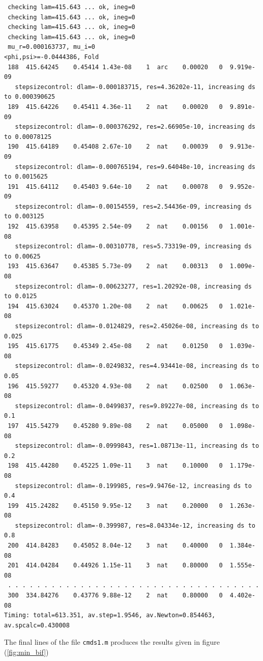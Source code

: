 \documentclass[a4paper,12pt]{article}
\begin{document}
\begin{verbatim}
 checking lam=415.643 ... ok, ineg=0
 checking lam=415.643 ... ok, ineg=0
 checking lam=415.643 ... ok, ineg=0
 checking lam=415.643 ... ok, ineg=0
 mu_r=0.000163737, mu_i=0 
<phi,psi>=-0.0444386, Fold
 188  415.64245    0.45414 1.43e-08    1  arc    0.00020   0  9.919e-09 
   stepsizecontrol: dlam=-0.000183715, res=4.36202e-11, increasing ds to 0.000390625
 189  415.64226    0.45411 4.36e-11    2  nat    0.00020   0  9.891e-09 
   stepsizecontrol: dlam=-0.000376292, res=2.66905e-10, increasing ds to 0.00078125
 190  415.64189    0.45408 2.67e-10    2  nat    0.00039   0  9.913e-09 
   stepsizecontrol: dlam=-0.000765194, res=9.64048e-10, increasing ds to 0.0015625
 191  415.64112    0.45403 9.64e-10    2  nat    0.00078   0  9.952e-09 
   stepsizecontrol: dlam=-0.00154559, res=2.54436e-09, increasing ds to 0.003125
 192  415.63958    0.45395 2.54e-09    2  nat    0.00156   0  1.001e-08 
   stepsizecontrol: dlam=-0.00310778, res=5.73319e-09, increasing ds to 0.00625
 193  415.63647    0.45385 5.73e-09    2  nat    0.00313   0  1.009e-08 
   stepsizecontrol: dlam=-0.00623277, res=1.20292e-08, increasing ds to 0.0125
 194  415.63024    0.45370 1.20e-08    2  nat    0.00625   0  1.021e-08 
   stepsizecontrol: dlam=-0.0124829, res=2.45026e-08, increasing ds to 0.025
 195  415.61775    0.45349 2.45e-08    2  nat    0.01250   0  1.039e-08 
   stepsizecontrol: dlam=-0.0249832, res=4.93441e-08, increasing ds to 0.05
 196  415.59277    0.45320 4.93e-08    2  nat    0.02500   0  1.063e-08 
   stepsizecontrol: dlam=-0.0499837, res=9.89227e-08, increasing ds to 0.1
 197  415.54279    0.45280 9.89e-08    2  nat    0.05000   0  1.098e-08 
   stepsizecontrol: dlam=-0.0999843, res=1.08713e-11, increasing ds to 0.2
 198  415.44280    0.45225 1.09e-11    3  nat    0.10000   0  1.179e-08 
   stepsizecontrol: dlam=-0.199985, res=9.9476e-12, increasing ds to 0.4
 199  415.24282    0.45150 9.95e-12    3  nat    0.20000   0  1.263e-08 
   stepsizecontrol: dlam=-0.399987, res=8.04334e-12, increasing ds to 0.8
 200  414.84283    0.45052 8.04e-12    3  nat    0.40000   0  1.384e-08 
 201  414.04284    0.44926 1.15e-11    3  nat    0.80000   0  1.555e-08 
 . . . . . . . . . . . . . . . . . . . . . . . . . . . . . . . . . . . 
 300  334.84276    0.43776 9.88e-12    2  nat    0.80000   0  4.402e-08 
Timing: total=613.351, av.step=1.9546, av.Newton=0.854463, av.spcalc=0.430008
\end{verbatim}
The final lines of the file {\tt cmds1.m} produces the results given in figure (\ref{fig:min_bif})
\end{document}
